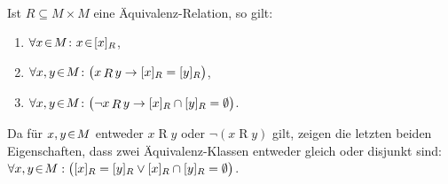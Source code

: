 \begin{Satz} \label{satz:aequivalenz-klassen}
\hspace*{\fill} \\
Ist $R \subseteq M \times M$ eine \"{A}quivalenz-Relation, so gilt: 
\begin{enumerate}
\item $\forall x \!\in\! M \colon x \!\in\! [x]_R$,
\item $\forall x, y \!\in\! M \colon \bigl(x \mathop{R} y \rightarrow [x]_R = [y]_R\bigr)$,
\item $\forall x, y \!\in\! M \colon \bigl(\neg x \mathop{R} y \rightarrow [x]_R \cap [y]_R = \emptyset\bigr)$.
\end{enumerate}
\end{Satz}


\remark
Da f\"{u}r $x,y\!\in\! M$ entweder $x \mathop{R} y$ oder $\neg (x \mathop{R} y)$ gilt, zeigen die
letzten beiden Eigenschaften, dass zwei \"{A}quivalenz-Klassen entweder gleich
oder disjunkt sind:
\\[0.2cm]
\hspace*{1.3cm}
$\forall x, y \!\in\! M: \bigl([x]_R = [y]_R \vee [x]_R \cap [y]_R = \emptyset\bigr)$. \eox

